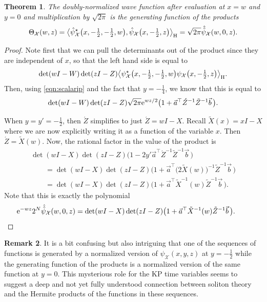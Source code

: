 \documentclass[pdftex]{sigma}
\numberwithin{equation}{section}
\newtheorem{Theorem}{Theorem}[section]
\theoremstyle{definition}
\newtheorem{Remark}[Theorem]{Remark}
\def\psistar{\psi^{\star}}
\def\X{\mathcal{X}}
\begin{document}
\begin{Theorem}\label{thm:normgen}
The doubly-normalized wave function after evaluation at $x=w$ and $y=0$
and multiplication by $\sqrt{2\pi}$ is the generating function of the products
\begin{equation}
\Theta_{\X}(w,z)= \big\langle \hat\psistar_{\X}\bigl(x,-\tfrac{1}{2},-\tfrac{1}{2},w\bigr),\hat\psi_{\X}\bigl(x,-\tfrac{1}{2},z\bigr)\big\rangle_{\rm H}
=\sqrt{2\pi}\hat{\hat\psi}_{\X}(w,0,z).\label{eqn:ipwz}
\end{equation}
\end{Theorem}
\begin{proof}
Note first that we can pull the determinants out of the
 product since they are independent of $x$, so that the left hand
 side is equal to
 \[
\det(wI-W)\det(zI-Z)\bigl\langle
 \psistar_{\X}\bigl(x,-\tfrac{1}{2},-\tfrac{1}{2},w\bigr)\psi_{\X}\bigl(x,-\tfrac{1}{2},z\bigr)\bigr\rangle_{\rm H}.
 \]
 Then, using \eqref{eqn:scalarip} and the fact that $y=-\tfrac{1}{4}$, we know that this is equal to
 \[
\det(wI-W)\det(zI-Z) \sqrt{2\pi }
{\rm e}^{wz/2}
 \bigl(1+\vec a^{\top}\acute Z^{-1}\tilde Z^{-1}\vec b\,\bigr).
 \]

When $y=y'=-\tfrac{1}{2}$, then
 $\acute Z$ simplifies to just $\acute Z=wI-X$.
Recall $\tilde X(x)=xI-X$ where we are now explicitly writing it as a
function of the variable $x$. Then $\acute Z=\tilde X(w)$.
Now, the rational factor in the value of the product is
\begin{gather*}
\det(wI-X)\det(zI-Z)
 \bigl(1-2y'\vec a^{\top}\acute Z^{-1}\tilde Z^{-1}\vec b\,\bigr)\\
\qquad=\det(wI-X)\det(zI-Z) \bigl(1+\vec a^{\top}\bigl(2 \tilde X(w)\bigr)^{-1}\tilde Z^{-1}\vec b\,\bigr)\\
\qquad =\det(wI-X)\det(zI-Z) \bigl(1+\vec a^{\top}\tilde X^{-1}(w)\tilde Z^{-1}\vec b\,\bigr).
\end{gather*}
 Note that this is exactly the polynomial
\begin{equation*}
{\rm e}^{-wz}2^N\hat{\hat \psi}_{\X}(w,0,z)=\det(w I-X)\det(zI-Z)\bigl(1+\vec a^{\top}\tilde X^{-1}(w)\tilde
 Z^{-1}\vec b\,\bigr).\tag*{\qed}
 \end{equation*}
 \renewcommand{\qed}{}
\end{proof}

\begin{Remark}
 It is a bit confusing but also intriguing that one of the sequences of
 functions is generated by a normalized version of $\psi_{\X}(x,y,z)$
 at $y=-\tfrac{1}{2}$ while the generating function of the products is a
 normalized version of the same function at $y=0$. This
mysterious role for the KP time variables seems to suggest a deep
and not yet fully understood connection between soliton theory and the
Hermite products of the functions in these sequences.
\end{Remark}
\end{document}

